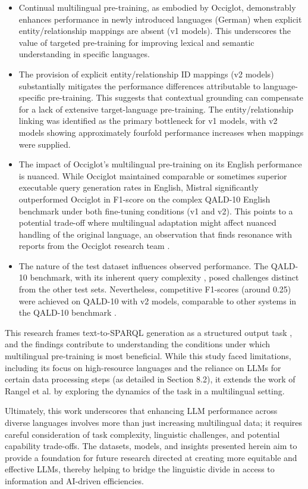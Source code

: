 \begin{itemize}
    \item Continual multilingual pre-training, as embodied by Occiglot, demonstrably enhances performance in newly introduced languages (German) when explicit entity/relationship mappings are absent (v1 models). 
    This underscores the value of targeted pre-training for improving lexical and semantic understanding in specific languages.
    \item The provision of explicit entity/relationship ID mappings (v2 models) substantially mitigates the performance differences attributable to language-specific pre-training. 
    This suggests that contextual grounding can compensate for a lack of extensive target-language pre-training.
    The entity/relationship linking was identified as the primary bottleneck for v1 models, with v2 models showing approximately fourfold performance increases when mappings were supplied.
    \item The impact of Occiglot's multilingual pre-training on its English performance is nuanced. 
    While Occiglot maintained comparable or sometimes superior executable query generation rates in English, Mistral significantly outperformed Occiglot in F1-score on the complex QALD-10 English benchmark under both fine-tuning conditions (v1 and v2).
    This points to a potential trade-off where multilingual adaptation might affect nuanced handling of the original language, an observation that finds resonance with reports from the Occiglot research team \cite{avramidis-etal-2024-occiglot, OcciglotResearchCollective2024Occiglot7BEU5Instruct}.
    \item The nature of the test dataset influences observed performance. 
    The QALD-10 benchmark, with its inherent query complexity \cite{usbeck2024qald}, posed challenges distinct from the other test sets. 
    Nevertheless, competitive F1-scores (around 0.25) were achieved on QALD-10 with v2 models, comparable to other systems in the QALD-10 benchmark \cite{usbeck2024qald}.
\end{itemize}

This research frames text-to-SPARQL generation as a structured output task \cite{goodfellow2016deep}, and the findings contribute to understanding the conditions under which multilingual pre-training is most beneficial. 
While this study faced limitations, including its focus on high-resource languages and the reliance on LLMs for certain data processing steps (as detailed in Section 8.2), it extends the work of Rangel et al. \cite{rangel2024sparqlgenerationanalysisfinetuning} by exploring the dynamics of the task in a multilingual setting.

Ultimately, this work underscores that enhancing LLM performance across diverse languages involves more than just increasing multilingual data; it requires careful consideration of task complexity, linguistic challenges, and potential capability trade-offs. 
The datasets, models, and insights presented herein aim to provide a foundation for future research directed at creating more equitable and effective LLMs, thereby helping to bridge the linguistic divide in access to information and AI-driven efficiencies.